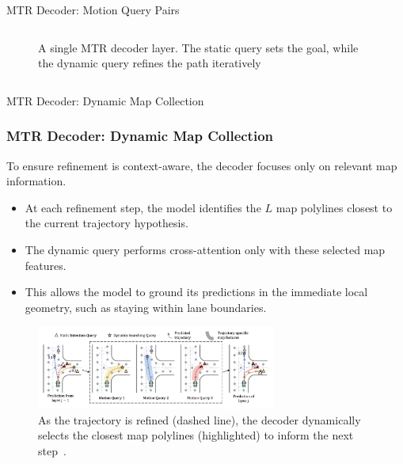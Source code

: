 \documentclass[10pt,aspectratio=169]{beamer}
\begin{document}
\begin{frame}{MTR Decoder: Motion Query Pairs}
\begin{columns}[T]
\begin{column}{0.4\textwidth}
\begin{figure}
                \caption{A single MTR decoder layer. The static query sets the goal, while the dynamic query refines the path iteratively~\cite{Shi2022MTR}}
            \end{figure}
        \end{column}
    \end{columns}
\end{frame}

\begin{frame}{MTR Decoder: Dynamic Map Collection}
    \frametitle{MTR Decoder: Dynamic Map Collection}
    To ensure refinement is context-aware, the decoder focuses only on relevant map information.
    \begin{itemize}
        \item At each refinement step, the model identifies the $L$ map polylines closest to the current trajectory hypothesis.
        \item The dynamic query performs cross-attention only with these selected map features.
        \item This allows the model to ground its predictions in the immediate local geometry, such as staying within lane boundaries.
    \end{itemize}
    \begin{figure}
        \centering
        \includegraphics[width=0.7\textwidth]{docs/latex/figures/dynamic_map.png}
        \caption{As the trajectory is refined (dashed line), the decoder dynamically selects the closest map polylines (highlighted) to inform the next step~\cite{Shi2022MTR}.}
        \label{fig:dynamic_map_pres}
    \end{figure}
\end{frame}
\end{document}
